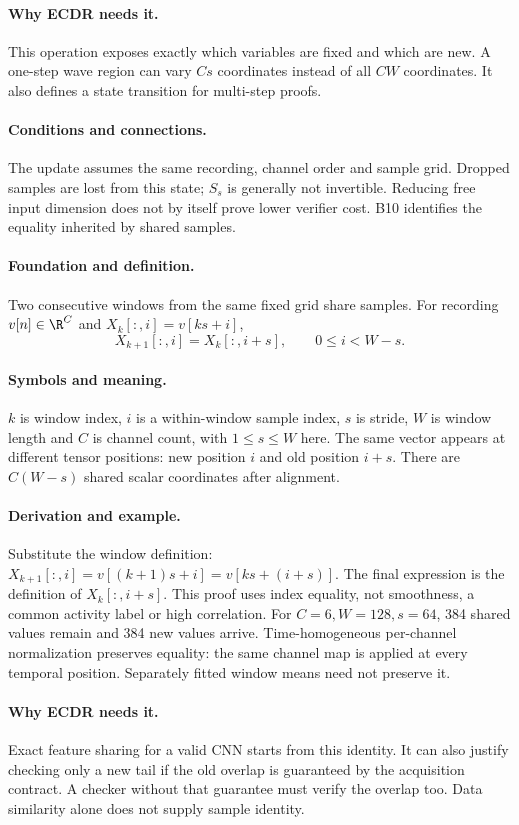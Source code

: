 \paragraph{Why ECDR needs it.}
This operation exposes exactly which variables are fixed and which are
new. A one-step wave region can vary $Cs$ coordinates instead of all
$CW$ coordinates. It also defines a state transition for multi-step proofs.
\paragraph{Conditions and connections.}
The update assumes the same recording, channel order and sample grid.
Dropped samples are lost from this state; $S_s$ is generally not invertible.
Reducing free input dimension does not by itself prove lower verifier cost.
B10 identifies the equality inherited by shared samples.

\paragraph{Foundation and definition.}
Two consecutive windows from the same fixed grid share samples. For
recording $v[n]\in\R^C$ and $X_k[:,i]=v[ks+i]$,
\[
 X_{k+1}[:,i]=X_k[:,i+s],\qquad 0\le i<W-s.
\]
\paragraph{Symbols and meaning.}
$k$ is window index, $i$ is a within-window sample index, $s$ is stride,
$W$ is window length and $C$ is channel count, with $1\le s\le W$ here. The same vector appears at
different tensor positions: new position $i$ and old position $i+s$.
There are $C(W-s)$ shared scalar coordinates after alignment.
\paragraph{Derivation and example.}
Substitute the window definition:
$X_{k+1}[:,i]=v[(k+1)s+i]=v[ks+(i+s)]$.
The final expression is the definition of $X_k[:,i+s]$. This proof uses
index equality, not smoothness, a common activity label or high correlation.
For $C=6,W=128,s=64$, 384 shared values remain and 384 new values arrive.
Time-homogeneous per-channel normalization preserves equality: the same
channel map is applied at every temporal position. Separately fitted window means need
not preserve it.
\paragraph{Why ECDR needs it.}
Exact feature sharing for a valid CNN starts from this identity. It can
also justify checking only a new tail if the old overlap is guaranteed by
the acquisition contract. A checker without that guarantee must verify the
overlap too. Data similarity alone does not supply sample identity.
